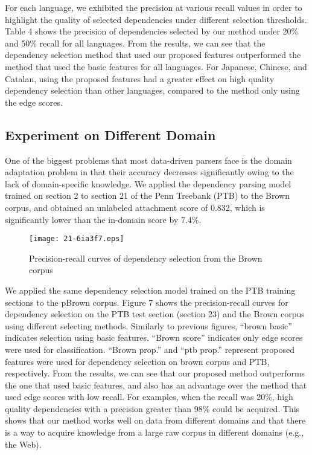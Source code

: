 \documentclass[english]{jnlp_1.4}
\begin{document}
For each language, we exhibited the precision at various recall values in order to highlight the quality of selected dependencies under different selection thresholds.
Table 4 shows the precision of dependencies selected by our method under 20\% and 50\% recall for all languages.
From the results, we can see that the dependency selection method that used our proposed features
outperformed the method that used the basic features for all languages. For Japanese, Chinese, and Catalan, using the proposed features had
a greater effect on high quality dependency selection than other languages, compared to the method only using the edge scores.


\subsection{Experiment on Different Domain}

One of the biggest problems that most data-driven parsers face 
is the domain adaptation problem in that their accuracy decreases significantly owing to the
lack of domain-specific knowledge. We applied the dependency parsing model trained on section 2 to section 21 of the Penn Treebank (PTB) to the Brown corpus, and obtained an
unlabeled attachment score of 0.832, which is significantly lower than
the in-domain score by 7.4\%.

\begin{figure}[b]
\begin{center}
\texttt{[image: 21-6ia3f7.eps]}
\end{center}
 \caption{Precision-recall curves of dependency selection from the Brown corpus}
\end{figure}

We applied the same dependency selection model trained on the PTB training sections to the
pBrown corpus. Figure 7 shows the precision-recall curves for dependency
selection on the PTB test section (section 23) and the Brown corpus using different selecting methods.
Similarly to previous figures, ``brown basic'' indicates selection using basic features. ``Brown score'' indicates only edge scores were used for classification.
``Brown prop.'' and ``ptb prop.'' represent proposed features were used for dependency selection on brown corpus and PTB, respectively.
From the results, we can see that our proposed method outperforms the one that used basic features,
and also has an advantage over the method that used edge scores with low recall.
For examples, when the recall was 20\%, high quality dependencies with a precision greater than 
98\% could be acquired. This shows that our method works well on data
from different domains and that there is a way to acquire
knowledge from a large raw corpus in different domains (e.g., the Web).
\end{document}
